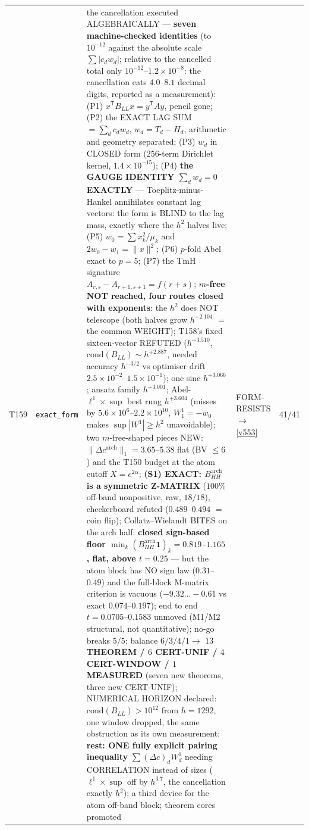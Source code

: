\documentclass[11pt,a4paper]{article}
\begin{document}
{\begin{xltabular}{\linewidth}{@{}p{0.95cm} >{\raggedright\arraybackslash}p{3.1cm} Y >{\raggedright\scriptsize\arraybackslash}p{3.35cm} p{1.15cm}@{}}
T159 & \texttt{\scriptsize exact\_\allowbreak form} & the cancellation executed ALGEBRAICALLY --- \textbf{seven machine-checked identities} (to $10^{-12}$ against the absolute scale $\sum|c_d w_d|$; relative to the cancelled total only $10^{-12}$--$1.2\times10^{-8}$: the cancellation eats $4.0$--$8.1$ decimal digits, reported as a measurement): (P1) $x^{\mathsf T}B_{LL}x=y^{\mathsf T}Ay$, pencil gone; (P2) the EXACT LAG SUM $=\sum_d c_d w_d$, $w_d=T_d-H_d$, arithmetic and geometry separated; (P3) $w_d$ in CLOSED form ($256$-term Dirichlet kernel, $1.4\times10^{-15}$); (P4) \textbf{the GAUGE IDENTITY $\sum_d w_d=0$ EXACTLY} --- Toeplitz-minus-Hankel annihilates constant lag vectors: the form is BLIND to the lag mass, exactly where the $h^2$ halves live; (P5) $w_0=\sum x_k^2/\mu_k$ and $2w_0-w_1=\|x\|^2$; (P6) $p$-fold Abel exact to $p=5$; (P7) the TmH signature $A_{r,s}-A_{r+1,s+1}=f(r+s)$; \textbf{$m$-free NOT reached, four routes closed with exponents}: the $h^2$ does NOT telescope (both halves grow $h^{+2.104}$ $=$ the common WEIGHT); T158's fixed sixteen-vector REFUTED ($h^{+3.510}$, $\mathrm{cond}(B_{LL})\sim h^{+2.887}$, needed accuracy $h^{-3/2}$ vs optimiser drift $2.5\times10^{-2}$--$1.5\times10^{-1}$); one sine $h^{+3.066}$; ansatz family $h^{+3.001}$; Abel-$\ell^1\times\sup$ best rung $h^{+3.604}$ (misses by $5.6\times10^{6}$--$2.2\times10^{10}$, $W^1_1=-w_0$ makes $\sup|W^1|\ge h^2$ unavoidable); two $m$-free-shaped pieces NEW: $\|\Delta c^{\mathrm{arch}}\|_1=3.65$--$5.38$ flat (BV $\le6$) and the T150 budget at the atom cutoff $X=e^{2\alpha}$; \textbf{(S1) EXACT: $B^{\mathrm{arch}}_{HH}$ is a symmetric Z-MATRIX} ($100\%$ off-band nonpositive, raw, $18/18$), checkerboard refuted ($0.489$--$0.494$ $=$ coin flip); Collatz--Wielandt BITES on the arch half: \textbf{closed sign-based floor $\min_k(B^{\mathrm{arch}}_{HH}\mathbf 1)_k=0.819$--$1.165$, flat, above $t=0.25$} --- but the atom block has NO sign law ($0.31$--$0.49$) and the full-block M-matrix criterion is vacuous ($-9.32\ldots-0.61$ vs exact $0.074$--$0.197$); end to end $t=0.0705$--$0.1583$ unmoved (M1/M2 structural, not quantitative); no-go breaks $5/5$; balance $6/3/4/1\to$ \textbf{$13$ THEOREM / $6$ CERT-UNIF / $4$ CERT-WINDOW / $1$ MEASURED} (seven new theorems, three new CERT-UNIF); NUMERICAL HORIZON declared: $\mathrm{cond}(B_{LL})>10^{12}$ from $h=1292$, one window dropped, the same obstruction as its own measurement; \textbf{rest: ONE fully explicit pairing inequality} $\sum(\Delta c)_d W^1_d$ needing CORRELATION instead of sizes ($\ell^1\times\sup$ off by $h^{3.7}$, the cancellation exactly $h^2$); a third device for the atom off-band block; theorem cores promoted & FORM-RESISTS $\to$ \vref{v553} & 41/41\\

\end{xltabular}}
\end{document}
